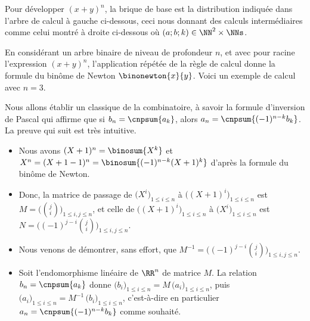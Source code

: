 Pour développer $(x + y)^n$, la brique de base est la distribution indiquée dans l'arbre de calcul à gauche ci-dessous, ceci nous donnant des calculs intermédiaires comme celui montré à droite ci-dessous où $(a;b;k) \in \NN^2 \times \NNs$.

%
            {\intertree}{}

En considérant un arbre binaire de niveau de profondeur $n$, et avec pour racine l'expression $(x + y)^n$, l'application répétée de la règle de calcul donne la formule du binôme de Newton
$\binonewton{x}{y}$.
%
Voici un exemple de calcul avec $n=3$.





\begin{remark} \label{binom-pascal-inv}
	Nous allons établir un classique de la combinatoire, à savoir la formule d'inversion de Pascal qui affirme que
	si
	$b_n = \cnpsum{a_k}$,
	alors
	$a_n = \cnpsum{(-1)^{n-k} b_k}$.
	La preuve qui suit est très intuitive.
	\begin{itemize}
		\item Nous avons
		$(X + 1)^n = \binosum{X^k}$
		et
		$X^n = (X + 1 - 1)^n = \binosum{(-1)^{n-k} (X+1)^k}$
		d'après la formule du binôme de Newton.
		

		\item Donc, la matrice de passage de
		$\big( X^i \big)_{1 \leq i \leq n}$
		à
		$\big( (X + 1)^i \big)_{1 \leq i \leq n}$
		est
		$M = \big( \binom{j}{i} \big)_{1 \leq i, j \leq n}$,
		et celle de
		$\big( (X + 1)^i \big)_{1 \leq i \leq n}$
		à
		$\big( X^i \big)_{1 \leq i \leq n}$
		est
		$N = \big( (-1)^{j-i} \binom{j}{i} \big)_{1 \leq i, j \leq n}$.
		

		\item Nous venons de démontrer, sans effort, que $M^{-1} = \big( (-1)^{j-i} \binom{j}{i} \big)_{1 \leq i, j \leq n}$.
		

		\item Soit l'endomorphisme linéaire de $\RR^n$ de matrice $M$.
		La relation
		$b_n = \cnpsum{a_k}$ 
		donne
		$\big( b_i \big)_{1 \leq i \leq n} = M \, \big( a_i \big)_{1 \leq i \leq n}$,
		puis
		$\big( a_i \big)_{1 \leq i \leq n} = M^{-1} \, \big( b_i \big)_{1 \leq i \leq n}$,
		c'est-à-dire en particulier
		$a_n = \cnpsum{(-1)^{n-k} b_k}$ comme souhaité.
	\end{itemize}
\end{remark}
